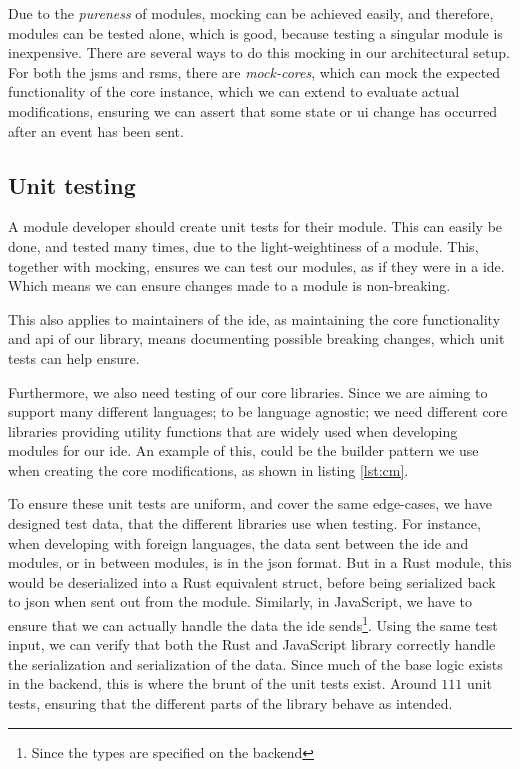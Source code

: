 Due to the \textit{pureness} of modules, mocking can be achieved easily, and
therefore, modules can be tested alone, which is good, because testing a
singular module is inexpensive. There are several ways to do this mocking in our
architectural setup. For both the \gls*{jsms} and \gls*{rsms}, there are
\textit{mock-cores}, which can mock the expected functionality of the core
instance, which we can extend to evaluate actual modifications, ensuring we can
assert that some state or \gls*{ui} change has occurred after an event has been
sent.


\subsection{Unit testing}

A module developer should create unit tests for their module. This can easily be
done, and tested many times, due to the light-weightiness of a module. This,
together with mocking, ensures we can test our modules, as if they were in a
\gls*{ide}. Which means we can ensure changes made to a module is non-breaking.

This also applies to maintainers of the \gls*{ide}, as maintaining the core
functionality and \gls*{api} of our library, means documenting possible breaking
changes, which unit tests can help ensure.

Furthermore, we also need testing of our core libraries. Since we are aiming to
support many different languages; to be language agnostic; we need different core
libraries providing utility functions that are widely used when developing
modules for our \gls{ide}. An example of this, could be the builder pattern we
use when creating the core modifications, as shown in listing \ref{lst:cm}.

To ensure these unit tests are uniform, and cover the same edge-cases, we have
designed test data, that the different libraries use when testing. For instance,
when developing with foreign languages, the data sent between the \gls{ide} and
modules, or in between modules, is in the \gls{json} format. But in a Rust
module, this would be deserialized into a Rust equivalent struct, before being
serialized back to \gls{json} when sent out from the module. Similarly, in
JavaScript, we have to ensure that we can actually handle the data the \gls{ide}
sends\footnote{Since the types are specified on the backend}. Using the same
test input, we can verify that both the Rust and JavaScript library correctly
handle the serialization and serialization of the data. Since much of the base
logic exists in the backend, this is where the brunt of the unit tests exist.
Around $111$ unit tests, ensuring that the different parts of the library
behave as intended.


